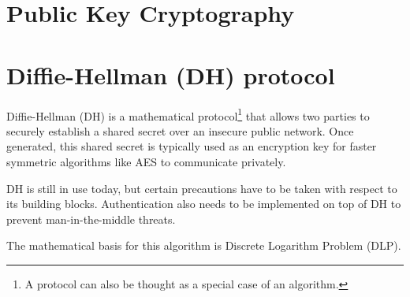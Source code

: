 \documentclass[a4paper, 12pt]{book} %
\begin{document}
\chapter{Public Key Cryptography}







\chapter{Diffie-Hellman (DH) protocol}

Diffie-Hellman (DH) is a mathematical protocol\footnote{A protocol can also be thought as a special case of an algorithm.} that allows two parties to securely establish a shared secret over an insecure public network. Once generated, this shared secret is typically used as an encryption key for faster symmetric algorithms like AES to communicate privately.

DH is still in use today, but certain precautions have to be taken with respect to its building blocks. Authentication also needs to be implemented on top of DH to prevent man-in-the-middle threats.

The mathematical basis for this algorithm is Discrete Logarithm Problem (DLP).
\usetikzlibrary{arrows.meta, calc, positioning}

\usetikzlibrary{arrows.meta, calc, positioning}
\usetikzlibrary{arrows.meta, calc, positioning}
\end{document}
